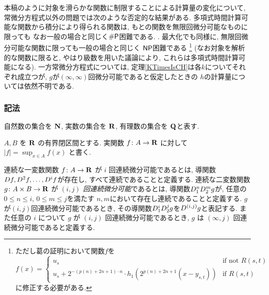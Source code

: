 本稿のように対象を滑らかな関数に制限することによる計算量の変化について,
常微分方程式以外の問題では次のような否定的な結果がある.
多項式時間計算可能な関数から積分により得られる関数は, 
もとの関数を無限回微分可能なものに限っても
なお一般の場合と同じく$\mathsf{\#P}$困難である. 
\cite[定理5.33]{ko1991complexity}.
最大化でも同様に, 
無限回微分可能な関数に限っても一般の場合と同じく
$\mathsf{NP}$困難である\cite[定理3.7]{ko1991complexity}%
\footnote{%
ただし葛\cite[定理3.7]{ko1991complexity}の証明において関数$f$を
\[f(x) = 
\begin{cases}
 u_s & \text{if not } R(s,t) \\
 u_s + 2^{-(p(n)+2n+1)\cdot n} \cdot h_1(2^{p(n)+2n+1} (x - y_{s,t})) & \text{if } R(s,t)
\end{cases}\]
に修正する必要がある.
}
(なお対象を解析的な関数に限ると, 
やはり級数を用いた議論により, 
これらは多項式時間計算可能になる). 
一方常微分方程式については, 
定理\ref{KTimesIsCH}は各$k$についてそれぞれ成立つが, 
$g$が$(\infty, \infty)$回微分可能であると仮定したときの
$h$の計算量については依然不明である. 

\subsubsection*{記法}
自然数の集合を $\mathbf N$, 実数の集合を $\mathbf R$, 
有理数の集合を $\mathbf Q$と表す. 

$A, B$ を $\mathbf R$ の有界閉区間とする. 
実関数 $f \colon A \to \mathbf R$ に対して $|f| = \sup_{x \in A} f(x)$ と書く.

連続な一変数関数 $f\colon A \to \mathbf R$ が $i$ 回連続微分可能であるとは,
導関数$D f, D^2 f, \dots, D^i f$が存在し, すべて連続であることと定義する.
連続な二変数関数 $g \colon A \times B \to \mathbf R$ が
\emph{$(i, j)$ 回連続微分可能}であるとは,
導関数$D_1^n D_2^m g$が, 任意の$0 \le n \le i$, $0 \le m \le j$を満たす
$n,m$において存在し連続であることと定義する.
$g$が$(i,j)$回連続微分可能であるとき,
その導関数$D_1^i D_2^j g$を$D^{(i,j)}g$と表記する.
また任意の $i$ について $g$ が $(i, j)$ 回連続微分可能であるとき,
$g$ は $(\infty, j)$ 回連続微分可能であると定義する.
